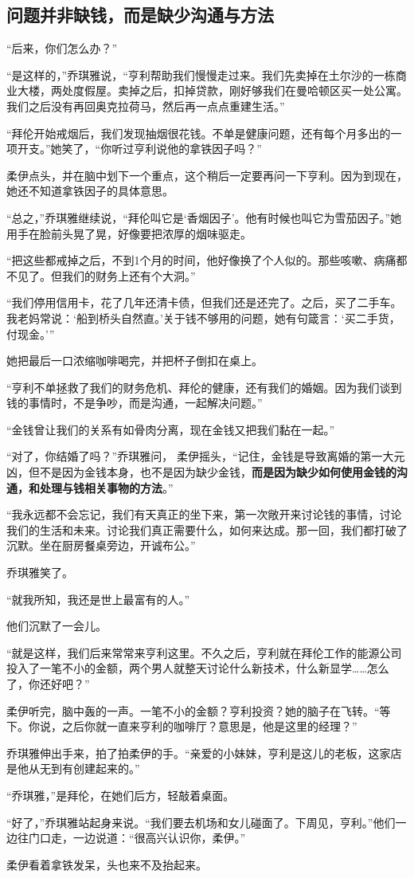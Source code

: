 \subsection{问题并非缺钱，而是缺少沟通与方法}

“后来，你们怎么办？”

“是这样的，”乔琪雅说，“亨利帮助我们慢慢走过来。我们先卖掉在土尔沙的一栋商业大楼，两处度假屋。卖掉之后，扣掉贷款，刚好够我们在曼哈顿区买一处公寓。我们之后没有再回奥克拉荷马，然后再一点点重建生活。”

“拜伦开始戒烟后，我们发现抽烟很花钱。不单是健康问题，还有每个月多出的一项开支。”她笑了，“你听过亨利说他的拿铁因子吗？”

柔伊点头，并在脑中划下一个重点，这个稍后一定要再问一下亨利。因为到现在，她还不知道拿铁因子的具体意思。

“总之，”乔琪雅继续说，“拜伦叫它是‘香烟因子’。他有时候也叫它为雪茄因子。”她用手在脸前头晃了晃，好像要把浓厚的烟味驱走。

“把这些都戒掉之后，不到1个月的时间，他好像换了个人似的。那些咳嗽、病痛都不见了。但我们的财务上还有个大洞。”

“我们停用信用卡，花了几年还清卡债，但我们还是还完了。之后，买了二手车。我老妈常说：‘船到桥头自然直。’关于钱不够用的问题，她有句箴言：‘买二手货，付现金。’”

她把最后一口浓缩咖啡喝完，并把杯子倒扣在桌上。

“亨利不单拯救了我们的财务危机、拜伦的健康，还有我们的婚姻。因为我们谈到钱的事情时，不是争吵，而是沟通，一起解决问题。”

“金钱曾让我们的关系有如骨肉分离，现在金钱又把我们黏在一起。”

“对了，你结婚了吗？”乔琪雅问， 柔伊摇头，“记住，金钱是导致离婚的第一大元凶，但不是因为金钱本身，也不是因为缺少金钱，\textbf{而是因为缺少如何使用金钱的沟通，和处理与钱相关事物的方法}。”

“我永远都不会忘记，我们有天真正的坐下来，第一次敞开来讨论钱的事情，讨论我们的生活和未来。讨论我们真正需要什么，如何来达成。那一回，我们都打破了沉默。坐在厨房餐桌旁边，开诚布公。”

乔琪雅笑了。

“就我所知，我还是世上最富有的人。”

他们沉默了一会儿。

“就是这样，我们后来常常来亨利这里。不久之后，亨利就在拜伦工作的能源公司投入了一笔不小的金额，两个男人就整天讨论什么新技术，什么新显学……怎么了，你还好吧？”

柔伊听完，脑中轰的一声。一笔不小的金额？亨利投资？她的脑子在飞转。“等下。你说，之后你就一直来亨利的咖啡厅？意思是，他是这里的经理？”

乔琪雅伸出手来，拍了拍柔伊的手。“亲爱的小妹妹，亨利是这儿的老板，这家店是他从无到有创建起来的。”

“乔琪雅，”是拜伦，在她们后方，轻敲着桌面。

“好了，”乔琪雅站起身来说。“我们要去机场和女儿碰面了。下周见，亨利。”他们一边往门口走，一边说道：“很高兴认识你，柔伊。”

柔伊看着拿铁发呆，头也来不及抬起来。
